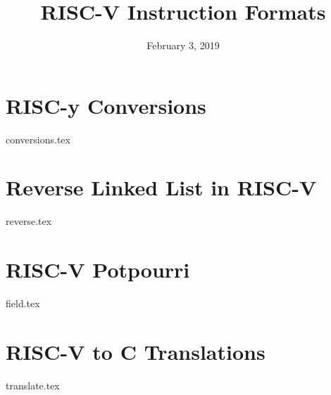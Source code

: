 \documentclass[11pt]{exam}
\title{RISC-V Instruction Formats}
\date{February 3, 2019}
\begin{document}
\maketitle

\section{RISC-y Conversions}
\begin{questions}
{conversions.tex}
\end{questions}
\clearpage

\section{Reverse Linked List in RISC-V}
\begin{questions}
{reverse.tex}
\end{questions}
\clearpage

\section{RISC-V Potpourri}
\begin{questions}
{field.tex}
\end{questions}
\clearpage

\section{RISC-V to C Translations}
\begin{questions}
{translate.tex}
\end{questions}
\clearpage
\end{document}
